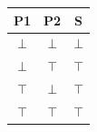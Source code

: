 \begin{tabular}{ccc}
\toprule
\textbf{P1} & \textbf{P2} & \textbf{S}\\
\midrule
\(\bot\) & \(\bot\) & \(\bot\)\\
\(\bot\) & \(\top\) & \(\top\)\\
\(\top\) & \(\bot\) & \(\top\)\\
\(\top\) & \(\top\) & \(\top\)\\
\bottomrule
\end{tabular}
